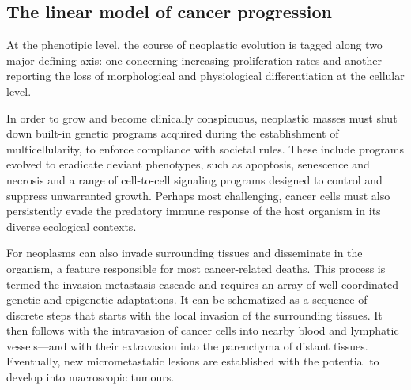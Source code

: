 \subsection{The linear model of cancer progression}
\label{sec:models-cancer-progression}

At the phenotipic level, the course of neoplastic evolution is tagged along two
major defining axis: one concerning increasing proliferation rates and another
reporting the loss of morphological and physiological differentiation at the
cellular level.\cite{tarabichi_systems_2013}


In order to grow and become clinically conspicuous, neoplastic masses must shut
down \mbox{built-in} genetic programs acquired during the establishment of
multicellularity, to enforce compliance with societal rules.  These include
programs evolved to eradicate deviant phenotypes, such as apoptosis, senescence
and necrosis and a range of \mbox{cell-to-cell} signaling programs designed to
control and suppress unwarranted growth.  Perhaps most challenging, cancer cells
must also persistently evade the predatory immune response of the host organism
in its diverse ecological contexts.

For neoplasms can also invade surrounding tissues and disseminate in the
organism, a feature responsible for most \mbox{cancer-related} deaths.  This
process is termed the \mbox{invasion-metastasis}
cascade\cite{valastyan_tumor_2011} and requires an array of well coordinated
genetic and epigenetic adaptations.  It can be schematized as a sequence of
discrete steps that starts with the local invasion of the surrounding tissues.
It then follows with the intravasion of cancer cells into nearby blood and
lymphatic vessels---and with their extravasion into the parenchyma of distant
tissues.  Eventually, new micrometastatic lesions are established with the
potential to develop into macroscopic tumours.


